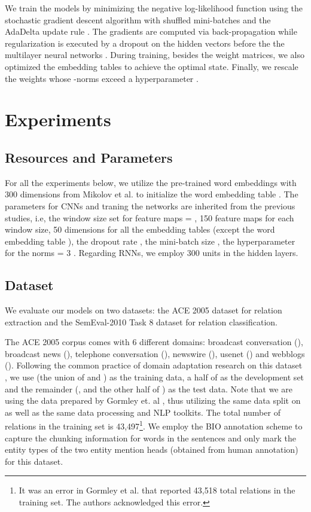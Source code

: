 \documentclass[11pt,letterpaper]{article}
\begin{document}
We train the models by minimizing the negative log-likelihood function using the stochastic gradient descent algorithm with shuffled mini-batches and the AdaDelta update rule \cite{Zeiler:12,Kim:14}. The gradients are computed via back-propagation while regularization is executed by a dropout on the hidden vectors before the the multilayer neural networks \cite{Hinton:12}. During training, besides the weight matrices, we also optimized the embedding tables   to achieve the optimal state. Finally, we rescale the weights whose -norms exceed a hyperparameter \cite{Kim:14,Nguyen:15a}. 

\section{Experiments}

\subsection{Resources and Parameters}



For all the experiments below, we utilize the pre-trained word embeddings  with 300 dimensions from Mikolov et al.  to initialize the word embedding table . The parameters for CNNs and traning the networks are inherited from the previous studies, i.e, the window size set for feature maps  = , 150 feature maps for each window size, 50 dimensions for all the embedding tables (except the word embedding table ), the dropout rate , the mini-batch size , the hyperparameter for the  norms = 3 \cite{Kim:14,Nguyen:15a}. Regarding RNNs, we employ 300 units in the hidden layers.

\subsection{Dataset}

We evaluate our models on two datasets: the ACE 2005 dataset for relation extraction and the SemEval-2010 Task 8 dataset \cite{Hendrickx:10} for relation classification.

The ACE 2005 corpus comes with 6 different domains: broadcast conversation (), broadcast news (), telephone conversation (), newswire (),  usenet () and webblogs (). Following the common practice of domain adaptation research on this dataset \cite{Plank:13,Nguyen:14,Nguyen:15c,Gormley:15}, we use  (the union of  and ) as the training data, a half of  as the development set and the remainder (,  and the other half of ) as the test data. Note that we are using the data prepared by Gormley et. al , thus utilizing the same data split on  as well as the same data processing and NLP toolkits. The total number of relations in the training set is 43,497\footnote{It was an error in Gormley et al.  that reported 43,518 total relations in the training set. The authors acknowledged this error.}. We employ the BIO annotation scheme to capture the chunking information for words in the sentences and only mark the entity types of the two entity mention heads (obtained from human annotation) for this dataset.
\end{document}
